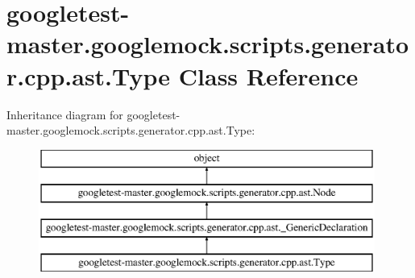 \hypertarget{classgoogletest-master_1_1googlemock_1_1scripts_1_1generator_1_1cpp_1_1ast_1_1_type}{}\section{googletest-\/master.googlemock.\+scripts.\+generator.\+cpp.\+ast.\+Type Class Reference}
\label{classgoogletest-master_1_1googlemock_1_1scripts_1_1generator_1_1cpp_1_1ast_1_1_type}
Inheritance diagram for googletest-\/master.googlemock.\+scripts.\+generator.\+cpp.\+ast.\+Type\+:\begin{figure}[H]
\begin{center}
\leavevmode
\includegraphics[height=4.000000cm]{dd/d1b/classgoogletest-master_1_1googlemock_1_1scripts_1_1generator_1_1cpp_1_1ast_1_1_type}
\end{center}
\end{figure}

